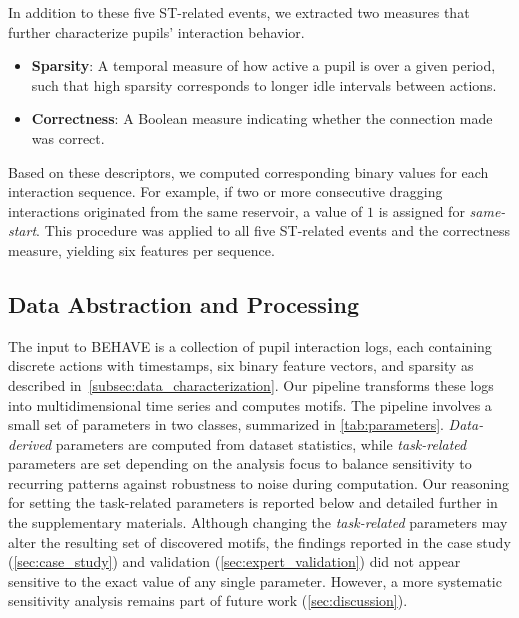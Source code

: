 \documentclass[letterpaper,journal]{IEEEtran}
\begin{document}
In addition to these five ST-related events, we extracted two measures that further characterize pupils' interaction behavior.
\begin{itemize}[nosep]
  \item
  \textbf{Sparsity}: A temporal measure of how active a pupil is over a given period, such that high sparsity corresponds to longer idle intervals between actions.

  \item 
  \textbf{Correctness}: A Boolean measure indicating whether the connection made was correct. 
\end{itemize}

Based on these descriptors, we computed corresponding binary values for each interaction sequence. 
For example, if two or more consecutive dragging interactions originated from the same reservoir, a value of $1$ is assigned for \textit{same-start}.
This procedure was applied to all five ST-related events and the correctness measure, yielding six features per sequence.


\subsection{Data Abstraction and Processing}
\label{subsec:data_abstraction}

The input to \textsc{BEHAVE} is a collection of pupil interaction logs, each containing discrete actions with timestamps, six binary feature vectors, and sparsity as described in~\cref{subsec:data_characterization}.
Our pipeline transforms these logs into multidimensional time series and computes motifs.
The pipeline involves a small set of parameters in two classes, summarized in \cref{tab:parameters}.
\textit{Data-derived} parameters are computed from dataset statistics, while \textit{task-related} parameters are set depending on the analysis focus to balance sensitivity to recurring patterns against robustness to noise during computation. 
Our reasoning for setting the task-related parameters is reported below and detailed further in the supplementary materials. 
Although changing the \textit{task-related} parameters may alter the resulting set of discovered motifs, the findings reported in the case study (\cref{sec:case_study}) and validation (\cref{sec:expert_validation}) did not appear sensitive to the exact value of any single parameter. 
However, a more systematic sensitivity analysis remains part of future work (\cref{sec:discussion}).
\end{document}
